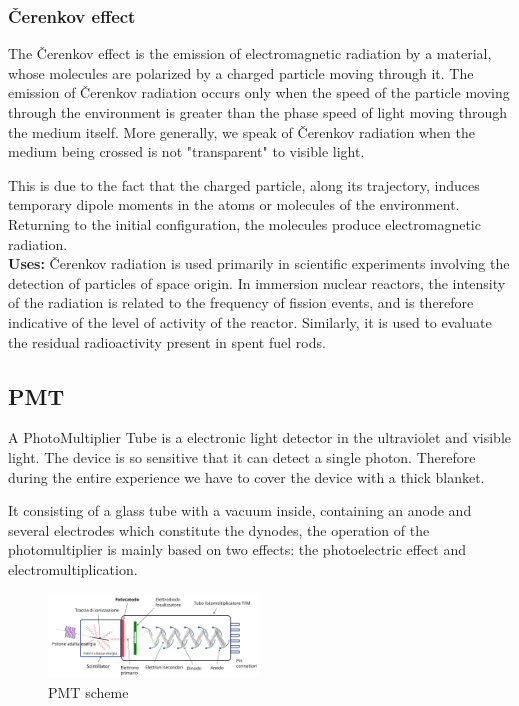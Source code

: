 \documentclass[a4paper,twoside,openany]{book}
\begin{document}
			\subsubsection{Čerenkov effect}
The Čerenkov effect is the emission of electromagnetic radiation by a material, whose molecules are polarized by a charged particle moving through it. The emission of Čerenkov radiation occurs only when the speed of the particle moving through the environment is greater than the phase speed of light moving through the medium itself. More generally, we speak of Čerenkov radiation when the medium being crossed is not "transparent" to visible light.

This is due to the fact that the charged particle, along its trajectory, induces temporary dipole moments in the atoms or molecules of the environment. Returning to the initial configuration, the molecules produce electromagnetic radiation.\\

\textbf{Uses:} Čerenkov radiation is used primarily in scientific experiments involving the detection of particles of space origin. In immersion nuclear reactors, the intensity of the radiation is related to the frequency of fission events, and is therefore indicative of the level of activity of the reactor. Similarly, it is used to evaluate the residual radioactivity present in spent fuel rods.

		\subsection{PMT}
A PhotoMultiplier Tube is a electronic light detector in the ultraviolet and visible light. The device is so sensitive that it can detect a single photon. Therefore during the entire experience we have to cover the device with a thick blanket.

It consisting of a glass tube with a vacuum inside, containing an anode and several electrodes which constitute the dynodes, the operation of the photomultiplier is mainly based on two effects: the photoelectric effect and electromultiplication.

\begin{figure}[H]
\centering
\includegraphics[width=0.5\textwidth, height=0.3\textwidth]{Schema PMT}
\caption{PMT scheme}
\end{figure}
\end{document}
